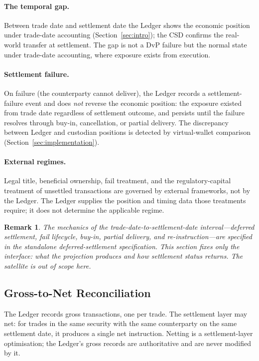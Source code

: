 \documentclass[11pt,a4paper]{article}
\newtheorem{remark}[definition]{Remark}
\begin{document}
\paragraph{The temporal gap.} Between trade date and settlement date the Ledger shows the economic position under trade-date accounting (Section~\ref{sec:intro}); the CSD confirms the real-world transfer at settlement. The gap is not a DvP failure but the normal state under trade-date accounting, where exposure exists from execution.

\paragraph{Settlement failure.} On failure (the counterparty cannot deliver), the Ledger records a settlement-failure event and does \emph{not} reverse the economic position: the exposure existed from trade date regardless of settlement outcome, and persists until the failure resolves through buy-in, cancellation, or partial delivery. The discrepancy between Ledger and custodian positions is detected by virtual-wallet comparison (Section~\ref{sec:implementation}).

\paragraph{External regimes.} Legal title, beneficial ownership, fail treatment, and the regulatory-capital treatment of unsettled transactions are governed by external frameworks, not by the Ledger. The Ledger supplies the position and timing data those treatments require; it does not determine the applicable regime.

\begin{remark}
The mechanics of the trade-date-to-settlement-date interval---deferred settlement, fail lifecycle, buy-in, partial delivery, and re-instruction---are specified in the standalone deferred-settlement specification. This section fixes only the interface: what the projection produces and how settlement status returns. The satellite is out of scope here.
\end{remark}

\subsection{Gross-to-Net Reconciliation}
\label{sec:settlement-netting}

The Ledger records gross transactions, one per trade. The settlement layer may net: for trades in the same security with the same counterparty on the same settlement date, it produces a single net instruction. Netting is a settlement-layer optimisation; the Ledger's gross records are authoritative and are never modified by it.
\end{document}
